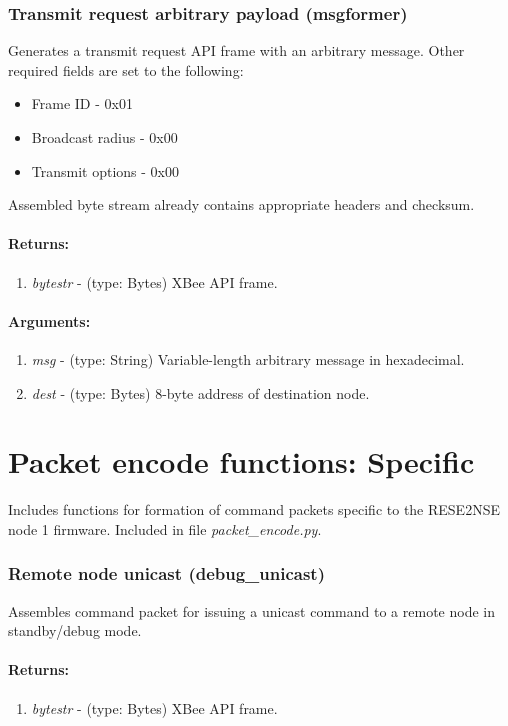 \section{Transmit request arbitrary payload (msgformer)}
Generates a transmit request API frame with an arbitrary message. Other required fields are set to the following:
\begin{itemize}
\item Frame ID - 0x01
\item Broadcast radius - 0x00
\item Transmit options - 0x00
\end{itemize}
Assembled byte stream already contains appropriate headers and checksum.
\subsection{Returns:}
\begin{enumerate}
\item \emph{bytestr} - (type: Bytes) XBee API frame.
\end{enumerate}
\subsection{Arguments:}
\begin{enumerate}
\item \emph{msg} - (type: String) Variable-length arbitrary message in hexadecimal.
\item \emph{dest} - (type: Bytes) 8-byte address of destination node.
\end{enumerate}

\part{Packet encode functions: Specific}

Includes functions for formation of command packets specific to the RESE2NSE node 1 firmware. Included in file \emph{packet\_encode.py}.

\section{Remote node unicast (debug\_unicast)}
Assembles command packet for issuing a unicast command to a remote node in standby/debug mode.
\subsection{Returns:}
\begin{enumerate}
\item \emph{bytestr} - (type: Bytes) XBee API frame.
\end{enumerate}
